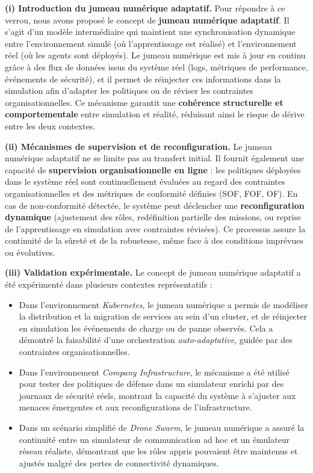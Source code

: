 \medskip
\noindent
\textbf{(i) Introduction du jumeau numérique adaptatif.}
Pour répondre à ce verrou, nous avons proposé le concept de \textbf{jumeau numérique adaptatif}.
Il s’agit d’un modèle intermédiaire qui maintient une synchronisation dynamique entre l’environnement simulé (où l’apprentissage est réalisé) et l’environnement réel (où les agents sont déployés).
Le jumeau numérique est mis à jour en continu grâce à des flux de données issus du système réel (logs, métriques de performance, événements de sécurité), et il permet de réinjecter ces informations dans la simulation afin d’adapter les politiques ou de réviser les contraintes organisationnelles.
Ce mécanisme garantit une \textbf{cohérence structurelle et comportementale} entre simulation et réalité, réduisant ainsi le risque de dérive entre les deux contextes.

\medskip
\noindent
\textbf{(ii) Mécanismes de supervision et de reconfiguration.}
Le jumeau numérique adaptatif ne se limite pas au transfert initial.
Il fournit également une capacité de \textbf{supervision organisationnelle en ligne} :
les politiques déployées dans le système réel sont continuellement évaluées au regard des contraintes organisationnelles et des métriques de conformité définies (SOF, FOF, OF).
En cas de non-conformité détectée, le système peut déclencher une \textbf{reconfiguration dynamique} (ajustement des rôles, redéfinition partielle des missions, ou reprise de l’apprentissage en simulation avec contraintes révisées).
Ce processus assure la continuité de la sûreté et de la robustesse, même face à des conditions imprévues ou évolutives.

\medskip
\noindent
\textbf{(iii) Validation expérimentale.}
Le concept de jumeau numérique adaptatif a été expérimenté dans plusieurs contextes représentatifs :
\begin{itemize}
  \item Dans l’environnement \textit{Kubernetes}, le jumeau numérique a permis de modéliser la distribution et la migration de services au sein d’un cluster, et de réinjecter en simulation les événements de charge ou de panne observés. Cela a démontré la faisabilité d’une orchestration \textit{auto-adaptative}, guidée par des contraintes organisationnelles.
  \item Dans l’environnement \textit{Company Infrastructure}, le mécanisme a été utilisé pour tester des politiques de défense dans un simulateur enrichi par des journaux de sécurité réels, montrant la capacité du système à s’ajuster aux menaces émergentes et aux reconfigurations de l’infrastructure.
  \item Dans un scénario simplifié de \textit{Drone Swarm}, le jumeau numérique a assuré la continuité entre un simulateur de communication ad hoc et un émulateur réseau réaliste, démontrant que les rôles appris pouvaient être maintenus et ajustés malgré des pertes de connectivité dynamiques.
\end{itemize}

